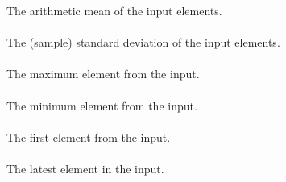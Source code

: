 The arithmetic mean of the input elements.

\paragraph{}

The (sample) standard deviation of the input elements.

\paragraph{}

The maximum element from the input.

\paragraph{}

The minimum element from the input.

\paragraph{}

The first element from the input.

\paragraph{}

The latest element in the input.
